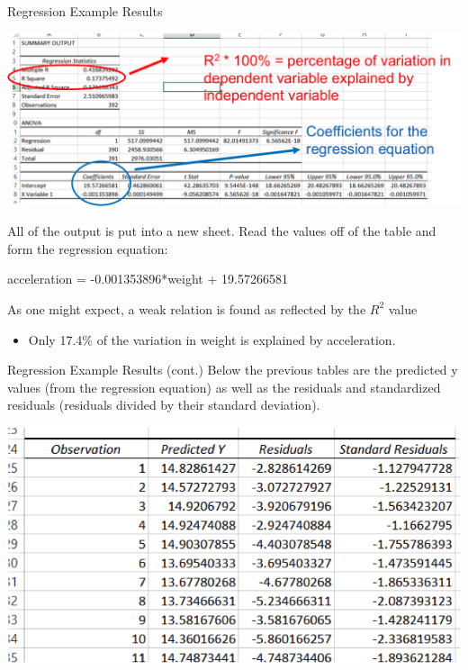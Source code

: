 \documentclass[xcolor=svgnames, handout]{beamer}
\begin{document}
\begin{frame}[label=current]{Regression Example Results}
\begin{center}\includegraphics[width=.8\textwidth]{RegressionResults}
\end{center}
All of the output is put into a new sheet.  Read the values off of the table and form the regression equation: 
\begin{center}
acceleration = -0.001353896*weight + 19.57266581
\end{center}
As one might expect, a weak relation is found as reflected by the  $R^2$ value 
\begin{itemize}
\item Only 17.4\% of the variation in weight is explained by acceleration. 
\end{itemize}

\end{frame}

\begin{frame}[label=current]{Regression Example Results (cont.)}
Below the previous tables are the predicted y values (from the regression equation) as well as the residuals and standardized residuals (residuals divided by their standard deviation). 
\begin{center}
\includegraphics[width=.75\textwidth]{RER1}
\end{center}
\end{frame}
\end{document}
